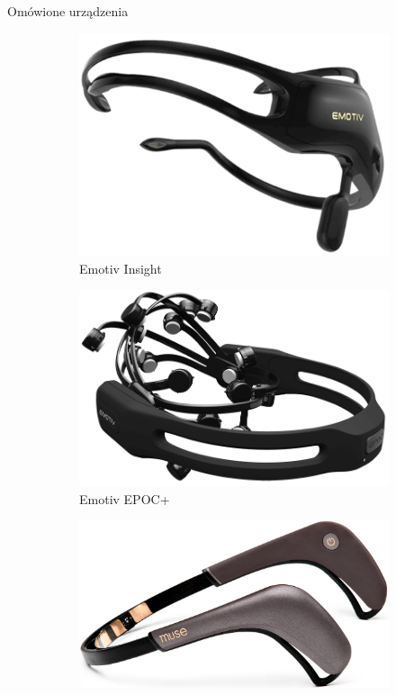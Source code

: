 \documentclass[10pt,aspectratio=169]{beamer}
\begin{document}
\begin{frame}{Omówione urządzenia}
  \begin{figure}[htb]
    \centering
    \begin{subfigure}{0.2\linewidth}
    \includegraphics[width=\linewidth,keepaspectratio]{obrazy/insight}
    \caption{Emotiv Insight}
    \end{subfigure}\hspace*{\fill}
    \begin{subfigure}{0.2\linewidth}
    \includegraphics[width=\linewidth,keepaspectratio]{obrazy/epoc}
    \caption{Emotiv EPOC+}
    \end{subfigure}\hspace*{\fill}
    \begin{subfigure}{0.2\linewidth}
    \includegraphics[width=\linewidth,keepaspectratio]{obrazy/muse2}

\end{subfigure}
\end{figure}
\end{frame}
\end{document}
